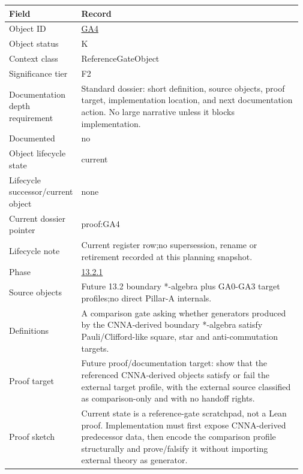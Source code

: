 \begin{longtable}{L{0.16\linewidth} L{0.81\linewidth}}
\hline
\textbf{Field} & \textbf{Record}\\
\hline
Object ID & \hyperlink{object-row-GA4}{GA4}\\
\hline\addlinespace[0.20em]
Object status & K\\
\hline\addlinespace[0.20em]
Context class & ReferenceGateObject\\
\hline\addlinespace[0.20em]
Significance tier & F2\\
\hline\addlinespace[0.20em]
Documentation depth requirement & Standard dossier: short definition, source objects, proof target, implementation location, and next documentation action. No large narrative unless it blocks implementation.\\
\hline\addlinespace[0.20em]
Documented & no\\
\hline\addlinespace[0.20em]
Object lifecycle state & current\\
\hline\addlinespace[0.20em]
Lifecycle successor/\allowbreak{}current object & none\\
\hline\addlinespace[0.20em]
Current dossier pointer & proof:GA4\\
\hline\addlinespace[0.20em]
Lifecycle note & Current register row;\newline no supersession, rename or retirement recorded at this planning snapshot.\\
\hline\addlinespace[0.20em]
Phase & \hyperlink{phase-row-13-2-1}{13.2.1}\\
\hline\addlinespace[0.20em]
Source objects & Future 13.2 boundary *-algebra plus GA0-GA3 target profiles;\newline no direct Pillar-A internals.\\
\hline\addlinespace[0.20em]
Definitions & A comparison gate asking whether generators produced by the CNNA-derived boundary *-algebra satisfy Pauli/\allowbreak{}Clifford-like square, star and anti-commutation targets.\\
\hline\addlinespace[0.20em]
Proof target & Future proof/\allowbreak{}documentation target: show that the referenced CNNA-derived objects satisfy or fail the external target profile, with the external source classified as comparison-only and with no handoff rights.\\
\hline\addlinespace[0.20em]
Proof sketch & Current state is a reference-gate scratchpad, not a Lean proof. Implementation must first expose CNNA-derived predecessor data, then encode the comparison profile structurally and prove/\allowbreak{}falsify it without importing external theory as generator.\\

\end{longtable}
